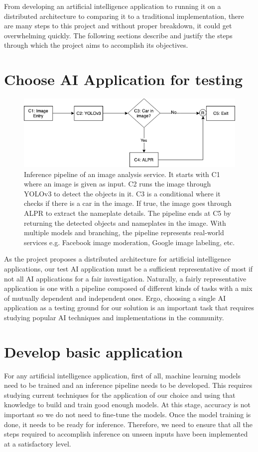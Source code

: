 \documentclass{report}
\begin{document}
From developing an artificial intelligence application to running it on a distributed architecture to comparing it to a traditional implementation, there are many steps to this project and without proper breakdown, it could get overwhelming quickly.
The following sections describe and justify the steps through which the project aims to accomplish its objectives.

\section{Choose AI Application for testing}

\begin{figure}[h!]
  \includegraphics[width=\textwidth]{CurrentImageService.png}
  \caption{Inference pipeline of an image analysis service. It starts with C1 where an image is given as input. C2 runs the image through YOLOv3 \cite{YOLOv3} to detect the objects in it. C3 is a conditional where it checks if there is a car in the image. If true, the image goes through ALPR \cite{OpenALPR} to extract the nameplate details. The pipeline ends at C5 by returning the detected objects and nameplates in the image. With multiple models and branching, the pipeline represents real-world services e.g. Facebook image moderation, Google image labeling, etc.}
  \label{fig:CurrentImageService}
\end{figure}

As the project proposes a distributed architecture for artificial intelligence applications, our test AI application must be a sufficient representative of most if not all AI applications for a fair investigation.
Naturally, a fairly representative application is one with a pipeline composed of different kinds of tasks with a mix of mutually dependent and independent ones.
Ergo, choosing a single AI application as a testing ground for our solution is an important task that requires studying popular AI techniques and implementations in the community.

\section{Develop basic application}
For any artificial intelligence application, first of all, machine learning models need to be trained and an inference pipeline needs to be developed.
This requires studying current techniques for the application of our choice and using that knowledge to build and train good enough models.
At this stage, accuracy is not important so we do not need to fine-tune the models.
Once the model training is done, it needs to be ready for inference.
Therefore, we need to ensure that all the steps required to accomplish inference on unseen inputs have been implemented at a satisfactory level.
\end{document}
